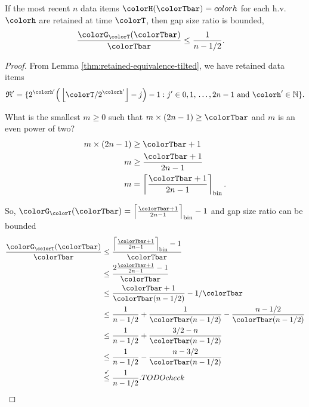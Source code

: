 \begin{lemma}
\label{thm:gap-size-ratio-tilted}
If the most recent $n$ data items $\colorH(\colorTbar) = colorh$ for each h.v. $\colorh$ are retained at time $\colorT$, then gap size ratio is bounded,
\begin{align*}
\frac{\colorG_{\colorT}(\colorTbar)}{\colorTbar}
&\leq
\frac{1}{n - 1/2}.
\end{align*}
\end{lemma}
\begin{proof}

From Lemma \ref{thm:retained-equivalence-tilted}, we have retained data items
\begin{align*}
\mathfrak{R}' =
\{
2^{\colorh'}\Big(\left\lfloor \colorT / 2^{\colorh'} \right\rfloor - j\Big) - 1
  :
  j' \in 0,1,\,\ldots,2n-1
  \text{ and }
  \colorh' \in \mathbb{N}
\}.
\end{align*}


What is the smallest $m \geq 0$ such that $m \times (2n - 1) \geq \colorTbar$ and $m$ is an even power of two?
\begin{align*}
m \times (2n - 1)
&\geq \colorTbar + 1\\
m
&\geq \frac{\colorTbar + 1}{2n - 1}\\
m
&= \left\lceil \frac{\colorTbar + 1 }{2n - 1} \right\rceil_{\mathrm{bin}}.
\end{align*}

So, $\colorG_{\colorT}(\colorTbar) = \left\lceil \frac{\colorTbar + 1 }{2n - 1} \right\rceil_{\mathrm{bin}} - 1$ and gap size ratio can be bounded
\begin{align*}
\frac{\colorG_{\colorT}(\colorTbar)}{\colorTbar}
&\leq
\frac{
\left\lceil \frac{\colorTbar + 1 }{2n - 1} \right\rceil_{\mathrm{bin}} - 1
}{
\colorTbar
}\\
&\leq
\frac{
2\frac{\colorTbar + 1}{2n - 1} - 1
}{
\colorTbar
}\\
&\leq
\frac{\colorTbar + 1}{\colorTbar(n - 1/2)} - 1/\colorTbar\\
&\leq
\frac{1}{n - 1/2} + \frac{1}{\colorTbar(n - 1/2)} - \frac{n - 1/2}{\colorTbar(n - 1/2)}\\
&\leq
\frac{1}{n - 1/2} + \frac{3/2 - n}{\colorTbar(n - 1/2)}\\
&\leq
\frac{1}{n - 1/2} - \frac{n - 3/2}{\colorTbar(n - 1/2)}\\
&\stackrel{\checkmark}{\leq}
\frac{1}{n - 1/2}. TODO check
\end{align*}

\end{proof}
